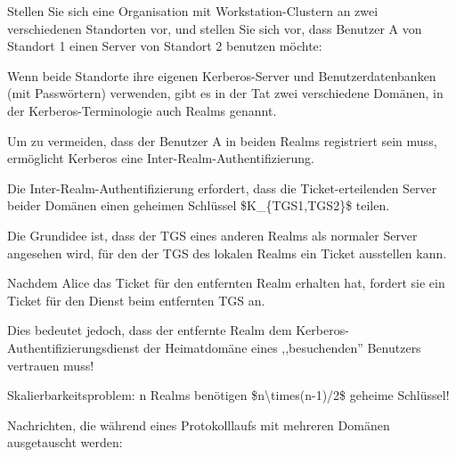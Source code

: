 \documentclass[a4paper]{article}
\begin{document}
\begin{multicols}{3}
      \begin{itemize*}
            \item
            Stellen Sie sich eine Organisation mit Workstation-Clustern an zwei
            verschiedenen Standorten vor, und stellen Sie sich vor, dass Benutzer
            A von Standort 1 einen Server von Standort 2 benutzen möchte:

            \begin{itemize*}
                  \item Wenn beide Standorte ihre eigenen Kerberos-Server und Benutzerdatenbanken (mit Passwörtern) verwenden, gibt es in der Tat zwei verschiedene Domänen, in der Kerberos-Terminologie auch Realms genannt.
                  \item Um zu vermeiden, dass der Benutzer A in beiden Realms registriert sein muss, ermöglicht Kerberos eine Inter-Realm-Authentifizierung.
            \end{itemize*}
            \item
            Die Inter-Realm-Authentifizierung erfordert, dass die
            Ticket-erteilenden Server beider Domänen einen geheimen Schlüssel
            \$K\_\{TGS1,TGS2\}\$ teilen.

            \begin{itemize*}
                  \item Die Grundidee ist, dass der TGS eines anderen Realms als normaler Server angesehen wird, für den der TGS des lokalen Realms ein Ticket ausstellen kann.
                  \item Nachdem Alice das Ticket für den entfernten Realm erhalten hat, fordert sie ein Ticket für den Dienst beim entfernten TGS an.
                  \item Dies bedeutet jedoch, dass der entfernte Realm dem Kerberos-Authentifizierungsdienst der Heimatdomäne eines ,,besuchenden'' Benutzers vertrauen muss!
                  \item Skalierbarkeitsproblem: n Realms benötigen \$n\textbackslash times(n-1)/2\$ geheime Schlüssel!
            \end{itemize*}
            \item
            Nachrichten, die während eines Protokolllaufs mit mehreren Domänen
            ausgetauscht werden:


\end{itemize*}
\end{multicols}
\end{document}
